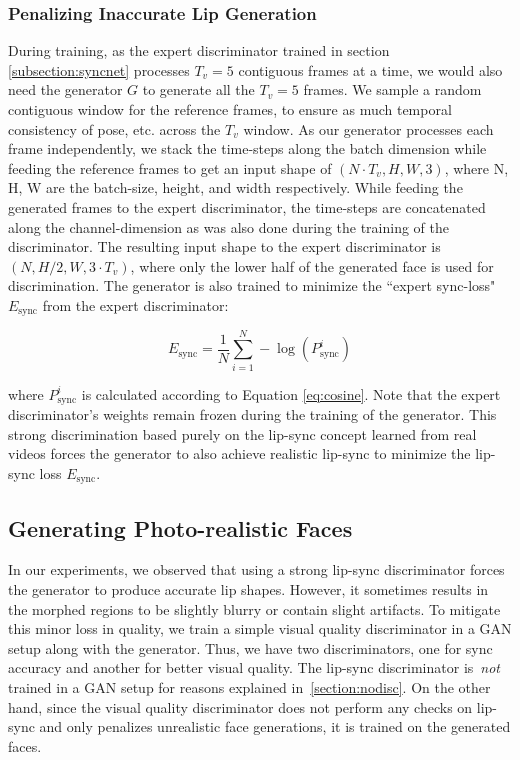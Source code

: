 \documentclass[sigconf]{acmart}
\begin{document}
\subsubsection{Penalizing Inaccurate Lip Generation}
During training, as the expert discriminator trained in section \ref{subsection:syncnet} processes $T_v=5$ contiguous frames at a time, we would also need the generator $G$ to generate all the $T_v=5$ frames. We sample a random contiguous window for the reference frames, to ensure as much temporal consistency of pose, etc. across the $T_v$ window. As our generator processes each frame independently, we stack the time-steps along the batch dimension while feeding the reference frames to get an input shape of $(N \cdot T_v, H, W, 3)$, where N, H, W are the batch-size, height, and width respectively. While feeding the generated frames to the expert discriminator, the time-steps are concatenated along the channel-dimension as was also done during the training of the discriminator. The resulting input shape to the expert discriminator is $(N, H/2, W, 3 \cdot T_v)$, where only the lower half of the generated face is used for discrimination. The generator is also trained to minimize the ``expert sync-loss" $E_\mathrm{sync}$ from the expert discriminator:

\begin{equation}
    E_\mathrm{sync} = \frac{1}{N} \sum^{N}_{i=1} - \log(P^{i}_{\mathrm{sync}})
    \label{eqn:syncloss}
\end{equation}

where $P^{i}_{\mathrm{sync}}$ is calculated according to Equation \ref{eq:cosine}. Note that the expert discriminator's weights remain frozen during the training of the generator. This strong discrimination based purely on the lip-sync concept learned from real videos forces the generator to also achieve realistic lip-sync to minimize the lip-sync loss $E_\mathrm{sync}$. 

\subsection{Generating Photo-realistic Faces}
In our experiments, we observed that using a strong lip-sync discriminator forces the generator to produce accurate lip shapes. However, it sometimes results in the morphed regions to be slightly blurry or contain slight artifacts. To mitigate this minor loss in quality, we train a simple visual quality discriminator in a GAN setup along with the generator. Thus, we have two discriminators, one for sync accuracy and another for better visual quality. The lip-sync discriminator is~\textit{not} trained in a GAN setup for reasons explained in~\ref{section:nodisc}. On the other hand, since the visual quality discriminator does not perform any checks on lip-sync and only penalizes unrealistic face generations, it is trained on the generated faces. 
\end{document}
